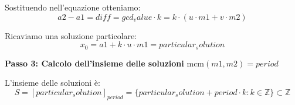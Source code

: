 Sostituendo nell'equazione otteniamo:
$${{a2}} - {{a1}} = {{diff}} = {{gcd_value}} \cdot {{k}} = {{k}} \cdot ({{u}} \cdot {{m1}} + {{v}} \cdot {{m2}})$$

Ricaviamo una soluzione particolare:
$$x_0 = {{a1}} + {{k}} \cdot {{u}} \cdot {{m1}} = {{particular_solution}}$$

\textbf{Passo 3: Calcolo dell'insieme delle soluzioni} 
$\mathrm{mcm}({{m1}}, {{m2}}) = {{period}}$

L'insieme delle soluzioni è:
$$S = [{{particular_solution}}]_{{{{period}}}} = \{{{{particular_solution}} + {{period}} \cdot k : k \in \mathbb{{Z}}\}} \subset \mathbb{{Z}}$$ 
